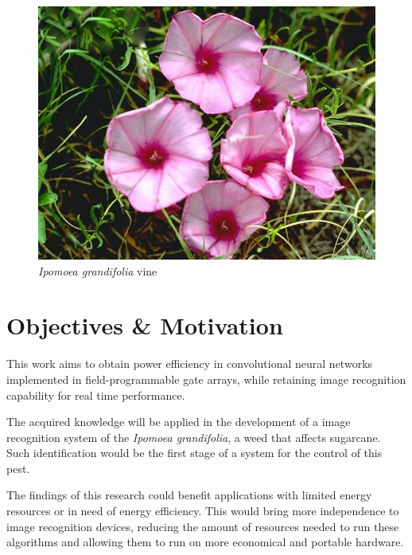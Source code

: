 \documentclass[
    12pt,                       %
    oneside,                    %
    a4paper,                    %
    brazil,                     %
    french,                     %
    spanish,                    %
    english,                    %
    ]{abntex2}
\begin{document}
\begin{figure}[htb]
  \caption{\label{fig:ipomoea}\textit{Ipomoea grandifolia} vine}
  \begin{center}
    \includegraphics[scale=0.5]{images/Ipomoea_grandifolia76.jpg}
  \end{center}
\end{figure}


\chapter[Objectives]{Objectives \& Motivation}

This work aims to obtain power efficiency in convolutional neural networks implemented in field-programmable gate arrays, while retaining image recognition capability for real time performance.

The acquired knowledge will be applied in the development of a image recognition system of the \textit{Ipomoea grandifolia}, a weed that affects sugarcane. Such identification would be the first stage of a system for the control of this pest.

The findings of this research could benefit applications with limited energy resources or in need of energy efficiency. This would bring more independence to image recognition devices, reducing the amount of resources needed to run these algorithms and allowing them to run on more economical and portable hardware.
\end{document}
